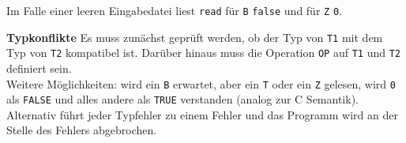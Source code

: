 \documentclass[ngerman,a4paper]{report}
\begin{document}
\begin{compactenum}
	Im Falle einer leeren Eingabedatei liest \lstinline!read! für \lstinline!B! \lstinline!false! und für \lstinline!Z! \lstinline!0!.\\
\item [\textbf{Typkonflikte}] Es muss zunächst geprüft werden, ob der Typ von \lstinline!T1! mit dem Typ von \lstinline!T2! kompatibel ist. Darüber hinaus muss die Operation \lstinline!OP! auf \lstinline!T1! und \lstinline!T2! definiert sein.\\
Weitere Möglichkeiten: wird ein \lstinline!B! erwartet, aber ein \lstinline!T! oder ein \lstinline!Z! gelesen, wird \lstinline!0! als \lstinline!FALSE! und alles andere als \lstinline!TRUE! verstanden (analog zur C Semantik). Alternativ führt jeder Typfehler zu einem Fehler und das Programm wird an der Stelle des Fehlers abgebrochen.
\end{compactenum}
\end{document}
